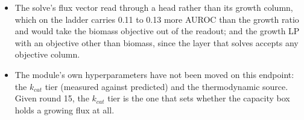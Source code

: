 \begin{itemize}
    form with the ceilings binding (0.80 at scale 100), or the solve on more genes than
    the 629 the split trains on.
  \item The solve's flux vector read through a head rather than its growth column, which
    on the ladder carries 0.11 to 0.13 more AUROC than the growth ratio and would take
    the biomass objective out of the readout; and the growth LP with an objective other
    than biomass, since the layer that solves accepts any objective column.
  \item The module's own hyperparameters have not been moved on this endpoint: the
    $k_{cat}$ tier (measured against predicted) and the thermodynamic source. Given
    round 15, the $k_{cat}$ tier is the one that sets whether the capacity box holds a
    growing flux at all.
\end{itemize}
